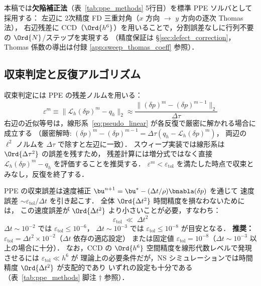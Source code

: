 本稿では\textbf{欠陥補正法}（表~\ref{tab:ppe_methods} 5行目）を標準 PPE ソルバとして採用する：
左辺に 2次精度 FD 三重対角（$x$ 方向 $\to$ $y$ 方向の逐次 Thomas 法），
右辺残差に CCD（$\Ord{h^6}$）を用いることで，分割誤差なしに行列不要の $\Ord{N}$/ステップを実現する
（精度保証は §\ref{sec:defect_correction}，Thomas 係数の導出は付録 \ref{app:sweep_thomas_coeff} 参照）．

\subsection{収束判定と反復アルゴリズム}
\label{sec:pseudo_convergence}

収束判定には PPE の残差ノルムを用いる：
\begin{equation}
  \varepsilon^m \equiv \bigl\|\mathcal{L}_h(\delta p)^m - q_h\bigr\|_2
  \approx \frac{\bigl\|(\delta p)^m - (\delta p)^{m-1}\bigr\|_2}{\Delta\tau}
  \label{eq:residual}
\end{equation}
右辺の近似等号は，線形系~\eqref{eq:pseudo_linear} が各反復で厳密に解かれる場合に成立する
（厳密解時: $(\delta p)^m - (\delta p)^{m-1} = \Delta\tau(q_h - \mathcal{L}_h(\delta p)^m)$，
両辺の $\ell^2$ ノルムを $\Delta\tau$ で除すと左辺に一致）．
スウィープ実装では線形系は $\Ord{\Delta\tau^2}$ の誤差を残すため，
残差計算には増分式ではなく直接 $\mathcal{L}_h(\delta p)^m - q_h$ を評価することを推奨する．
$\varepsilon^m < \varepsilon_{\mathrm{tol}}$ を満たした時点で収束とみなし，反復を終了する．

\begin{tcolorbox}[resultbox, title={$\varepsilon_{\mathrm{tol}}$ 選択の実用基準}]
\label{result:etol_criterion}
PPE の収束誤差は速度補正 $\bu^{n+1} = \bu^* - (\Delta t/\rho)\bnabla(\delta p)$ を通じて
速度誤差 $\sim \varepsilon_\mathrm{tol}/\Delta t$ を引き起こす．
全体 $\Ord{\Delta t^2}$ 時間精度を損なわないためには，
この速度誤差が $\Ord{\Delta t^2}$ より小さいことが必要，すなわち：
\begin{equation}
  \varepsilon_\mathrm{tol} \;\ll\; \Delta t^2
  \label{eq:etol_physical}
\end{equation}
$\Delta t \sim 10^{-2}$ では $\varepsilon_\mathrm{tol} \leq 10^{-6}$，
$\Delta t \sim 10^{-3}$ では $\varepsilon_\mathrm{tol} \leq 10^{-8}$ が目安となる．
\textbf{推奨：} $\varepsilon_\mathrm{tol} = \Delta t^2 \times 10^{-2}$（$\Delta t$ 依存の適応設定）
または固定値 $\varepsilon_\mathrm{tol} = 10^{-8}$（$\Delta t \sim 10^{-3}$ 以上の場合に十分）．
なお，CCD の $\Ord{h^6}$ 空間精度を線形代数レベルで発現させるには $\varepsilon_\mathrm{tol} \ll h^6$ が
理論上の必要条件だが，NS シミュレーションでは時間精度 $\Ord{\Delta t^2}$ が支配的であり
いずれの設定も十分である（表~\ref{tab:ppe_methods} 脚注 $\dagger$ 参照）．
\end{tcolorbox}

